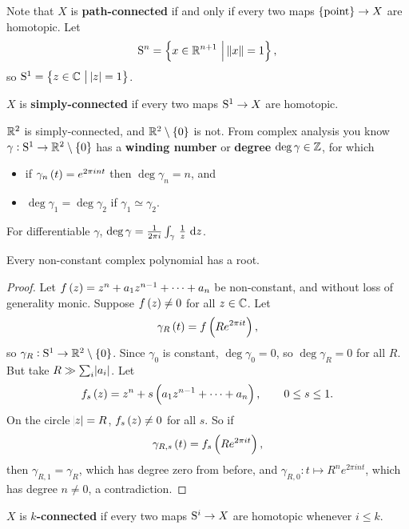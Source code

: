 Note that $ X $ is \textbf{path-connected} if and only if every two maps $ \pt \to X $ are homotopic. Let
$$ \S^n = \cbr{x \in \RR^{n + 1} \st \norm{x} = 1}, $$
so $ \S^1 = \cbr{z \in \CC \st \abs{z} = 1} $.

\begin{definition*}
$ X $ is \textbf{simply-connected} if every two maps $ \S^1 \to X $ are homotopic.
\end{definition*}

\begin{example*}
$ \RR^2 $ is simply-connected, and $ \RR^2 \setminus \cbr{0} $ is not. From complex analysis you know $ \gamma : \S^1 \to \RR^2 \setminus \cbr{0} $ has a \textbf{winding number} or \textbf{degree} $ \deg \gamma \in \ZZ $, for which
\begin{itemize}
\item if $ \gamma_n\br{t} = e^{2\pi int} $ then $ \deg \gamma_n = n $, and
\item $ \deg \gamma_1 = \deg \gamma_2 $ if $ \gamma_1 \simeq \gamma_2 $.
\end{itemize}
For differentiable $ \gamma $, $ \deg \gamma = \tfrac{1}{2\pi i}\intd{\gamma}{}{\tfrac{1}{z}}{z} $.
\end{example*}

\begin{corollary}
Every non-constant complex polynomial has a root.
\end{corollary}

\begin{proof}
Let $ f\br{z} = z^n + a_1z^{n - 1} + \dots + a_n $ be non-constant, and without loss of generality monic. Suppose $ f\br{z} \ne 0 $ for all $ z \in \CC $. Let
$$ \gamma_R\br{t} = f\br{Re^{2\pi it}}, $$
so $ \gamma_R : \S^1 \to \RR^2 \setminus \cbr{0} $. Since $ \gamma_0 $ is constant, $ \deg \gamma_0 = 0 $, so $ \deg \gamma_R = 0 $ for all $ R $. But take $ R \gg \sum_i \abs{a_i} $. Let
$$ f_s\br{z} = z^n + s\br{a_1z^{n - 1} + \dots + a_n}, \qquad 0 \le s \le 1. $$
On the circle $ \abs{z} = R $, $ f_s\br{z} \ne 0 $ for all $ s $. So if
$$ \gamma_{R, s}\br{t} = f_s\br{Re^{2\pi it}}, $$
then $ \gamma_{R, 1} = \gamma_R $, which has degree zero from before, and $ \gamma_{R, 0} : t \mapsto R^ne^{2\pi int} $, which has degree $ n \ne 0 $, a contradiction.
\end{proof}

\begin{definition*}
$ X $ is \textbf{$ k $-connected} if every two maps $ \S^i \to X $ are homotopic whenever $ i \le k $.
\end{definition*}

